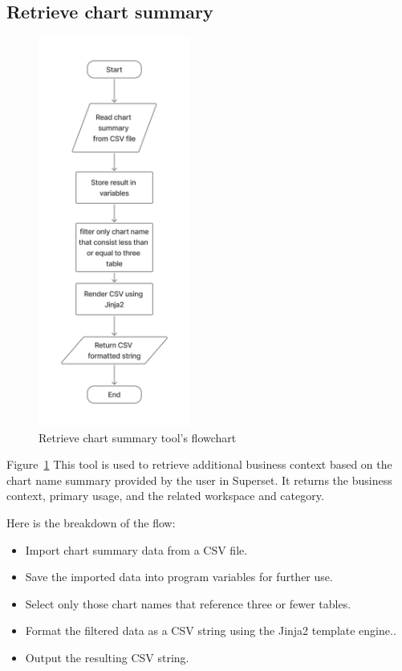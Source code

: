     \subsection{Retrieve chart summary}
    \begin{figure}[H]
        \centering
        \includegraphics[width=5cm]{chapters/3/figures/chart_summary.jpg}
        \caption[Retrieve chart summary tool’s flowchart]{Retrieve chart summary tool’s flowchart}
        \label{fig:chart_summary}
    \end{figure}
    Figure~\ref{fig:chart_summary} This tool is used to retrieve additional business context based on the chart name summary provided by the user in Superset. It returns the business context, primary usage, and the related workspace and category.

    Here is the breakdown of the flow:
    \begin{itemize}
        \item  Import chart summary data from a CSV file.
        \item  Save the imported data into program variables for further use.
        \item  Select only those chart names that reference three or fewer tables.
        \item  Format the filtered data as a CSV string using the Jinja2 template engine..
        \item  Output the resulting CSV string.
    \end{itemize}

